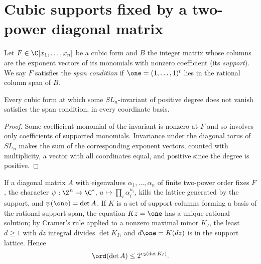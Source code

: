 \section{Cubic supports fixed by a two-power diagonal matrix}\label{sec:support}

Let $F\in\C[x_1,\dots,x_n]$ be a cubic form and $B$ the integer matrix whose
columns are the exponent vectors of its monomials with nonzero coefficient
(its \emph{support}). We say $F$ satisfies the \emph{span condition} if
$\one=(1,\dots,1)^t$ lies in the rational column span of $B$.

\begin{lemma}\label{lem:span}
Every cubic form at which some $SL_n$-invariant of positive degree does not
vanish satisfies the span condition, in every coordinate basis.
\end{lemma}

\begin{proof}
Some coefficient monomial of the invariant is nonzero at $F$ and so involves
only coefficients of supported monomials. Invariance under the diagonal torus
of $SL_n$ makes the sum of the corresponding exponent vectors, counted with
multiplicity, a vector with all coordinates equal, and positive since the
degree is positive.
\end{proof}

If a diagonal matrix $A$ with eigenvalues $\alpha_1,\dots,\alpha_n$ of finite
two-power order fixes $F$, the character $\psi:\Z^n\to\C^*$,
$u\mapsto\prod_i\alpha_i^{u_i}$, kills the lattice generated by the support,
and $\psi(\one)=\det A$. If $K$ is a set of support columns forming a basis of
the rational support span, the equation $Kz=\one$ has a unique rational
solution; by Cramer's rule applied to a nonzero maximal minor $K_I$, the least
$d\ge1$ with $dz$ integral divides $\det K_I$, and $d\one=K(dz)$ is in the
support lattice. Hence
\begin{equation}\label{eq:cramer}
 \ord(\det A)\le2^{v_2(\det K_I)} .
\end{equation}

